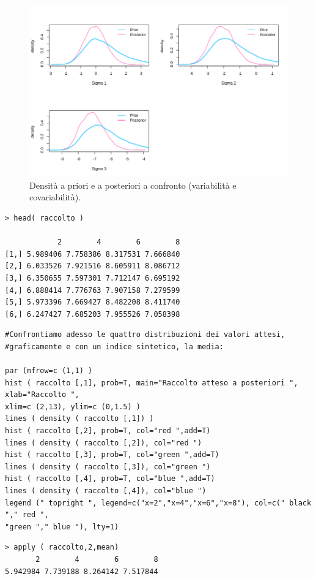 \begin{figure}
    \centering
    \includegraphics[totalheight=10cm]{img/esercizio11-2-4.png}
    \caption{  Densità a priori e a posteriori a confronto (variabilità e covariabilità).}
\end{figure}

{
\color{red}
\begin{Verbatim}
> head( raccolto )

            2        4        6        8
[1,] 5.989406 7.758386 8.317531 7.666840
[2,] 6.033526 7.921516 8.605911 8.086712
[3,] 6.350655 7.597301 7.712147 6.695192
[4,] 6.888414 7.776763 7.907158 7.279599
[5,] 5.973396 7.669427 8.482208 8.411740
[6,] 6.247427 7.685203 7.955526 7.058398
\end{Verbatim}
}

\begin{lstlisting}[style=R]
#Confrontiamo adesso le quattro distribuzioni dei valori attesi,
#graficamente e con un indice sintetico, la media:

par (mfrow=c (1,1) )
hist ( raccolto [,1], prob=T, main="Raccolto atteso a posteriori ", xlab="Raccolto ",
xlim=c (2,13), ylim=c (0,1.5) )
lines ( density ( raccolto [,1]) )
hist ( raccolto [,2], prob=T, col="red ",add=T)
lines ( density ( raccolto [,2]), col="red ")
hist ( raccolto [,3], prob=T, col="green ",add=T)
lines ( density ( raccolto [,3]), col="green ")
hist ( raccolto [,4], prob=T, col="blue ",add=T)
lines ( density ( raccolto [,4]), col="blue ")
legend (" topright ", legend=c("x=2","x=4","x=6","x=8"), col=c(" black "," red ",
"green "," blue "), lty=1)
\end{lstlisting}

{
\color{red}
\begin{Verbatim}
> apply ( raccolto,2,mean)
       2        4        6        8
5.942984 7.739188 8.264142 7.517844
\end{Verbatim}
}

